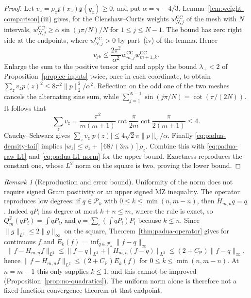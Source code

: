 \documentclass[preprint,12pt,a4paper]{elsarticle}
\theoremstyle{remark}
\newtheorem{remark}[theorem]{Remark}
\newcommand{\CC}{\mathrm{CC}}
\newcommand{\Pa}{\mathrm P}
\begin{document}
\begin{proof}
Let $v_z=\rho_z\mathfrak g(x_z)\mathfrak g(y_z)\ge0$, and put $\alpha=\pi-4/3$.
Lemma~\ref{lem:weight-comparison}\,(iii) gives, for the Clenshaw--Curtis
weights $w^{\CC}_{N,j}$ of the mesh with $N$ intervals,
$w^{\CC}_{N,j}\ge\alpha\sin(j\pi/N)/N$ for $1\le j\le N-1$.
The bound has zero right side at the endpoints, where $w^{\CC}_{N,j}>0$ by
part~(iv) of the lemma. Hence
\[
 v_{jk}\le\frac{2\pi^2}{\alpha^2}w^{\CC}_{m,j}w^{\CC}_{m+1,k}.
\]
Enlarge the sum to the positive tensor grid and apply the bound
$\lambda_+<2$ of Proposition~\ref{prop:cc-inputs} twice, once in each
coordinate, to obtain
$\sum_zv_zp(z)^2\le8\pi^2\|p\|_2^2/\alpha^2$.
Reflection on the odd one of the two meshes cancels the alternating
sine sum, while
$\sum_{j=1}^{N-1}\sin(j\pi/N)=\cot(\pi/(2N))$.
It follows that
\[
 \sum_zv_z=\frac{\pi^2}{m(m+1)}
 \cot\frac\pi{2m}\cot\frac\pi{2(m+1)}\le4.
\]
Cauchy--Schwarz gives
$\sum_zv_z|p(z)|\le4\sqrt2\pi\|p\|_2/\alpha$.
Finally \eqref{eq:padua-density-tail} implies
$|w_z|\le v_z+[68/(3m)]\rho_z$. Combine this with
\eqref{eq:padua-raw-L1} and \eqref{eq:padua-L1-norm} for the upper
bound. Exactness reproduces the constant one, whose $L^2$ norm on
the square is two, proving the lower bound.
\end{proof}

\begin{remark}[Reproduction and error bound]\label{rem:reproduction}
Uniformity of the norm does not require signed Gram positivity or an upper
signed MZ inequality. The operator reproduces low degrees: if
$q\in\mathcal P_k$ with $0\le k\le\min(n,m-n)$, then $H_{m,n}q=q$. Indeed
$qP_i$ has degree at most $k+n\le m$, where the rule is exact, so
$Q_m^\Pa(qP_i)=\int qP_i$, and $q=\sum_i(\int qP_i)P_i$ because $k\le n$.
Since $\|g\|_{L^2}\le2\|g\|_\infty$ on the square, Theorem~\ref{thm:padua-operator}
gives for continuous $f$ and $E_k(f)=\inf_{q\in\mathcal P_k}\|f-q\|_\infty$
\[
 \|f-H_{m,n}f\|_{L^2}\le\|f-q\|_{L^2}+\|H_{m,n}(f-q)\|_{L^2}
 \le(2+C_{\Pa})\|f-q\|_\infty ,
\]
hence $\|f-H_{m,n}f\|_{L^2}\le(2+C_{\Pa})E_k(f)$ for
$0\le k\le\min(n,m-n)$. At $n=m-1$ this only supplies $k\le1$, and this
cannot be improved (Proposition~\ref{prop:no-quadratics}). The uniform norm
alone is therefore not a fixed-function convergence theorem at that endpoint.
\end{remark}
\end{document}

